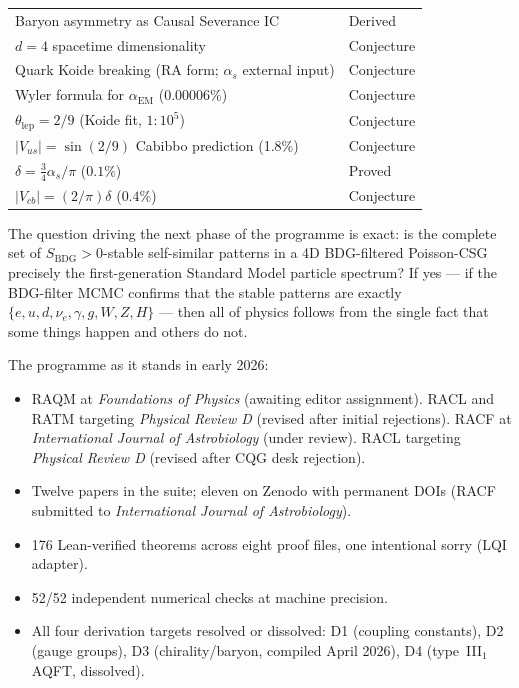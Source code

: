 \documentclass[11pt,a4paper]{article}
\newcommand{\SBDG}{S_{\mathrm{BDG}}}
\begin{document}
\begin{center}
\begin{tabular}{ll}
Baryon asymmetry as Causal Severance IC & Derived \\
$d = 4$ spacetime dimensionality & Conjecture \\
Quark Koide breaking (RA form; $\alpha_s$ external input) & Conjecture \\
Wyler formula for $\alpha_{\mathrm{EM}}$ (0.00006\%) & Conjecture \\
$\theta_{\mathrm{lep}} = 2/9$ (Koide fit, $1:10^5$) & Conjecture \\
$|V_{us}| = \sin(2/9)$ Cabibbo prediction (1.8\%) & Conjecture \\
$\delta = \tfrac{3}{4}\alpha_s/\pi$ ($0.1\%$) & Proved \\
$|V_{cb}| = (2/\pi)\delta$ ($0.4\%$) & Conjecture \\
\bottomrule
\end{tabular}
\end{center}

\medskip
The question driving the next phase of the programme is exact:
is the complete set of $\SBDG > 0$-stable self-similar patterns
in a 4D BDG-filtered Poisson-CSG precisely the first-generation
Standard Model particle spectrum? If yes --- if the BDG-filter MCMC
confirms that the stable patterns are exactly $\{e, u, d, \nu_e,
\gamma, g, W, Z, H\}$ --- then all of physics follows from the
single fact that some things happen and others do not.

\medskip
The programme as it stands in early 2026:
\begin{itemize}[noitemsep]
  \item RAQM at \emph{Foundations of Physics} (awaiting editor assignment).
  RACL and RATM targeting \emph{Physical Review D} (revised after initial rejections).
  RACF at \emph{International Journal of Astrobiology} (under review).
  RACL targeting \emph{Physical Review D} (revised after CQG desk rejection).
  \item Twelve papers in the suite; eleven on Zenodo with permanent
  DOIs (RACF submitted to \emph{International Journal of Astrobiology}).
  \item 176 Lean-verified theorems across eight proof files, one
  intentional sorry (LQI adapter).
  \item 52/52 independent numerical checks at machine precision.
  \item All four derivation targets resolved or dissolved:
  D1 (coupling constants), D2 (gauge groups), D3 (chirality/baryon,
  compiled April 2026), D4 (type~III$_1$ AQFT, dissolved).
\end{itemize}
\end{document}
